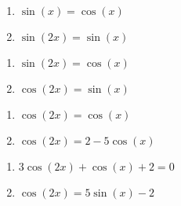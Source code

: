 \begin{multicols}{2}

\begin{enumerate}

\setcounter{enumi}{\value{HW}}

\item $\sin \left( x \right) = \cos \left( x \right)$ \label{solveidentfirst}
\item $\sin \left( 2x \right) = \sin \left( x \right)$

\setcounter{HW}{\value{enumi}}

\end{enumerate}

\end{multicols}

\begin{multicols}{2}

\begin{enumerate}

\setcounter{enumi}{\value{HW}}

\item $\sin \left( 2x \right) = \cos \left( x \right)$
\item $\cos \left( 2x \right) = \sin \left( x \right)$

\setcounter{HW}{\value{enumi}}

\end{enumerate}

\end{multicols}

\begin{multicols}{2}

\begin{enumerate}

\setcounter{enumi}{\value{HW}}

\item $\cos \left( 2x \right) = \cos \left( x \right)$
\item  $\cos(2x) = 2 - 5\cos(x)$

\setcounter{HW}{\value{enumi}}

\end{enumerate}

\end{multicols}

\begin{multicols}{2}

\begin{enumerate}

\setcounter{enumi}{\value{HW}}

\item  $3\cos(2x) + \cos(x) + 2 = 0$
\item  $\cos(2x) = 5\sin(x) - 2$

\setcounter{HW}{\value{enumi}}

\end{enumerate}

\end{multicols}

